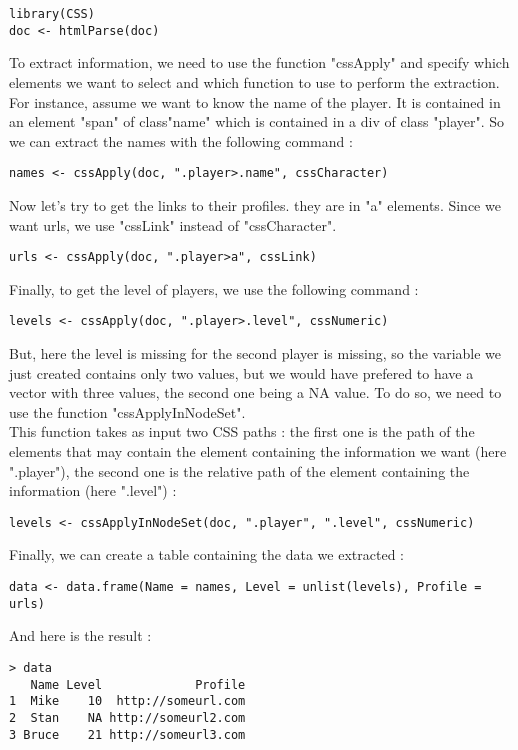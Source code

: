 \documentclass{article}
\begin{document}
\begin{verbatim}
library(CSS)
doc <- htmlParse(doc)
\end{verbatim}

To extract information, we need to use the function "cssApply" and specify which elements we want to select and which function to use to perform the extraction. For instance, assume we want to know the name of the player. It is contained in an element "span" of class"name" which is contained in a div of class "player". So we can extract the names with the following command :

\begin{verbatim}
names <- cssApply(doc, ".player>.name", cssCharacter)
\end{verbatim}

Now let's try to get the links to their profiles. they are in "a" elements. Since we want urls, we use "cssLink" instead of "cssCharacter".

\begin{verbatim}
urls <- cssApply(doc, ".player>a", cssLink)
\end{verbatim}

Finally, to get the level of players, we use the following command :

\begin{verbatim}
levels <- cssApply(doc, ".player>.level", cssNumeric)
\end{verbatim}

But, here the level is missing for the second player is missing, so the variable we just created contains only two values, but we would have prefered to have a vector with three values, the second one being a NA value. To do so, we need to use the function "cssApplyInNodeSet".\\

This function takes as input two CSS paths : the first one is the path of the elements that may contain the element containing the information we want (here ".player"), the second one is the relative path of the element containing the information (here ".level") :

\begin{verbatim}
levels <- cssApplyInNodeSet(doc, ".player", ".level", cssNumeric)
\end{verbatim}

Finally, we can create a table containing the data we extracted :

\begin{verbatim}
data <- data.frame(Name = names, Level = unlist(levels), Profile = urls)
\end{verbatim}

And here is the result :

\begin{verbatim}
> data
   Name Level             Profile
1  Mike    10  http://someurl.com
2  Stan    NA http://someurl2.com
3 Bruce    21 http://someurl3.com
\end{verbatim}
\end{document}
